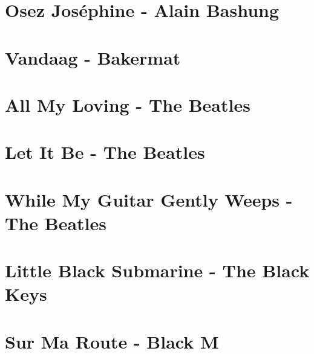 \documentclass{guitartabs}
\begin{document}
\section{Osez Joséphine - Alain Bashung}
\begin{guitar}

\end{guitar}

\section{Vandaag - Bakermat}
\begin{guitar}

\end{guitar}



\section*{All My Loving - The Beatles}
\begin{guitar}

\end{guitar}

\section*{Let It Be - The Beatles}
\begin{guitar}

\end{guitar}

\section*{While My Guitar Gently Weeps - The Beatles}
\begin{guitar}

\end{guitar}

\section{Little Black Submarine - The Black Keys}
\begin{guitar}

\end{guitar}

\section{Sur Ma Route - Black M}
\begin{guitar}

\end{guitar}
\end{document}
